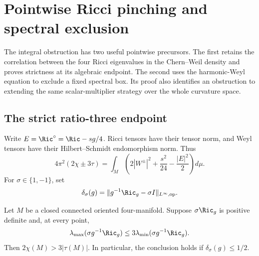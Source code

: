 \section{Pointwise Ricci pinching and spectral exclusion}
\label{sec:early-pointwise-rigidity}

The integral obstruction has two useful pointwise precursors.  The first
retains the correlation between the four Ricci eigenvalues in the
Chern--Weil density and proves strictness at its algebraic endpoint.
The second uses the harmonic-Weyl equation to exclude a fixed spectral
box.  Its proof also identifies an obstruction to extending the same
scalar-multiplier strategy over the whole curvature space.

\subsection{The strict ratio-three endpoint}

Write $E=\Ric^\circ=\Ric-sg/4$.  Ricci tensors have their tensor norm,
and Weyl tensors have their Hilbert--Schmidt endomorphism norm.  Thus
\begin{equation}\label{eq:epr-cw}
 4\pi^2(2\chi\pm3\tau)
 =\int_M\left(2|W^\pm|^2+\frac{s^2}{24}
                                      -\frac{|E|^2}{2}\right)d\mu.
\end{equation}
For $\sigma\in\{1,-1\}$, set
\[
 \delta_\sigma(g)
 =\|g^{-1}\Ric_g-\sigma I\|_{L^\infty,\mathrm{op}}.
\]

\begin{proposition}
\label{prop:epr-ratio-three}
Let $M$ be a closed connected oriented four-manifold.  Suppose
$\sigma\Ric_g$ is positive definite and, at every point,
\begin{equation}\label{eq:epr-ratio-three}
 \lambda_{\max}(\sigma g^{-1}\Ric_g)
 \leq3\lambda_{\min}(\sigma g^{-1}\Ric_g).
\end{equation}
Then $2\chi(M)>3|\tau(M)|$.  In particular, the conclusion holds if
$\delta_\sigma(g)\leq1/2$.
\end{proposition}

